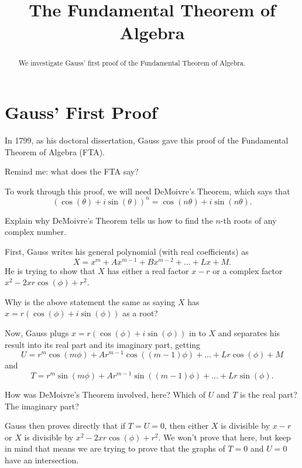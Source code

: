 \documentclass[nooutcomes]{ximera}
\title{The Fundamental Theorem of Algebra}
\begin{document}
\begin{abstract}
    We investigate Gauss' first proof of the Fundamental Theorem of Algebra.
\end{abstract}
\maketitle

\section*{Gauss' First Proof}

In 1799, as his doctoral dissertation, Gauss gave this proof of the Fundamental Theorem of Algebra (FTA).

\begin{question}
    Remind me: what does the FTA say?
\end{question}

To work through this proof, we will need DeMoivre's Theorem, which says that
\[
(\cos(\theta) + i \sin(\theta))^n = \cos(n\theta) + i \sin(n\theta).
\]
\begin{question}
    Explain why DeMoivre's Theorem tells us how to find the $n$-th roots of any complex number.
\end{question}

First, Gauss writes his general polynomial (with real coefficients) as
\[
X = x^m + A x^{m-1} + B x^{m-2} + \dots + L x + M.
\]
He is trying to show that $X$ has either a real factor $x-r$ or a complex factor $x^2 - 2xr\cos(\phi) + r^2$.

\begin{question}
    Why is the above statement the same as saying $X$ has $x=r(\cos(\phi) + i\sin(\phi))$ as a root?
\end{question}

Now, Gauss plugs $x=r(\cos(\phi) + i\sin(\phi))$ in to $X$ and separates his result into its real part and its imaginary part, getting
\[
U = r^m\cos(m\phi) + A r^{m-1} \cos((m-1)\phi) + \dots + L r \cos (\phi) + M
\]
and
\[
T = r^m\sin(m\phi) + A r^{m-1} \sin((m-1)\phi) + \dots + L r \sin (\phi).
\]
\begin{question}
    How was DeMoivre's Theorem involved, here?  Which of $U$ and $T$ is the real part?  The imaginary part?
\end{question}

Gauss then proves directly that if $T=U=0$, then either $X$ is divisible by $x-r$ or $X$ is divisible by $x^2-2xr\cos(\phi) + r^2$.  We won't prove that here, but keep in mind that means we are trying to prove that the graphs of $T=0$ and $U=0$ have an intersection.
\end{document}
